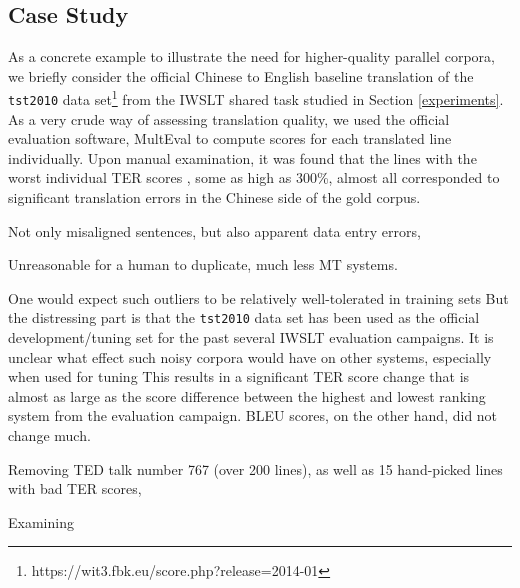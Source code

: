 \subsection{Case Study}
\label{case_study}

As a concrete example to illustrate the need for higher-quality parallel corpora, we briefly consider the official Chinese to English baseline translation of the {\small \tt tst2010} data set\footnote{https://wit3.fbk.eu/score.php?release=2014-01} from the IWSLT shared task studied in Section \ref{experiments}.
As a very crude way of assessing translation quality, we used the official evaluation software, MultEval  to compute scores for each translated line individually.
Upon manual examination, it was found that the lines with the worst individual TER scores , some as high as 300\%, almost all corresponded to significant translation errors in the Chinese side of the gold corpus.

Not only misaligned sentences, but also apparent data entry errors, 

Unreasonable for a human to duplicate, much less MT systems.

One would expect such outliers to be relatively well-tolerated in training sets
But the distressing part is that the {\small \tt tst2010} data set has been used as the official development/tuning set for the past several IWSLT evaluation campaigns.
It is unclear what effect such noisy corpora would have on other systems, 
especially when used for tuning
This results in a significant TER score change that is almost as large as the score difference between the highest and lowest ranking system from the evaluation campaign.  
BLEU scores, on the other hand, did not change much.

Removing TED talk number 767 (over 200 lines), as well as 15 hand-picked lines with bad TER scores, 


















Examining 


